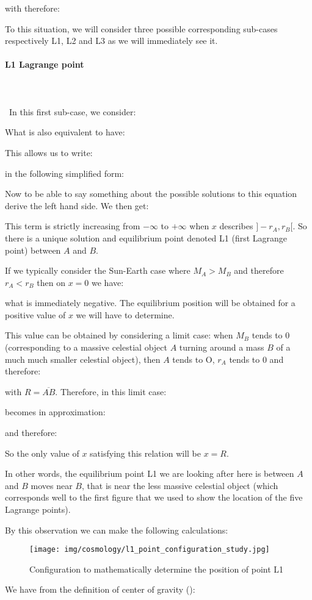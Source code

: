 	with therefore:
	
	To this situation, we will consider three possible corresponding sub-cases respectively L1, L2 and L3 as we will immediately see it.
	
	\paragraph{L1 Lagrange point}\mbox{}\\\\\
	In this first sub-case, we consider:
	
	What is also equivalent to have:
	
	This allows us to write:
	
	in the following simplified form:
	
	Now to be able to say something about the possible solutions to this equation derive the left hand side. We then get:
	
	This term is strictly increasing from $-\infty$ to $+\infty$ when $x$ describes $]-r_A,r_B[$. So there is a unique solution and equilibrium point denoted L1 (first Lagrange point) between $A$ and $B$.

	If we typically consider the Sun-Earth case where $M_A>M_B$ and therefore $r_A<r_B$ then on $x=0$ we have:
	
	what is immediately negative. The equilibrium position will be obtained for a positive value of $x$ we will have to determine.

	This value can be obtained by considering a limit case: when $M_B$ tends to $0$ (corresponding to a massive celestial object $A$ turning around a mass $B$ of a much much smaller celestial object), then $A$ tends to O, $r_A$ tends to $0$ and therefore:
	
	with $R=\overline{AB}$. Therefore, in this limit case:
	
	becomes in approximation:
	
	and therefore:
	
	So the only value of $x$ satisfying this relation will be $x=R$.

	In other words, the equilibrium point L1 we are looking after here is between $A$ and $B$ moves near $B$, that is near the less massive celestial object (which corresponds well to the first figure that we used to show the location of the five Lagrange points).

	By this observation we can make the following calculations: 
	\begin{figure}[H]
		\begin{center}
		\texttt{[image: img/cosmology/l1\_point\_configuration\_study.jpg]}
		\end{center}	
		\caption[]{Configuration to mathematically determine the position of point L1}
	\end{figure}
	We have from the definition of center of gravity ():
	
